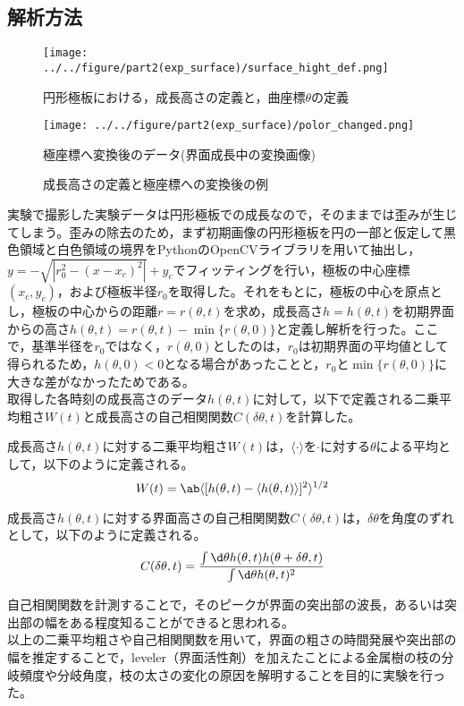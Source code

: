 \documentclass[autodetect-engine,dvi=dvipdfmx,a4paper,ja=standard,oneside,openany,11pt,draft]{bxjsbook}
\begin{document}
\subsection{解析方法}
\begin{figure}[H]
  \begin{minipage}
    {0.64\textwidth}
    \centering
    \texttt{[image: ../../figure/part2(exp\_surface)/surface\_hight\_def.png]}
    \caption{円形極板における，成長高さの定義と，曲座標$\theta$の定義}
    \label{fig:surface_hight_def}
  \end{minipage}
  \begin{minipage}
    {0.32\textwidth}
    \centering
    \texttt{[image: ../../figure/part2(exp\_surface)/polor\_changed.png]}
    \caption{極座標へ変換後のデータ(界面成長中の変換画像)}
    \label{fig:polor_changed}
  \end{minipage}
  \caption{成長高さの定義と極座標への変換後の例}
  \label{fig:surface_hight_def_polor_changed}
\end{figure}
実験で撮影した実験データは円形極板での成長なので，そのままでは歪みが生じてしまう。歪みの除去のため，まず初期画像の円形極板を円の一部と仮定して黒色領域と白色領域の境界をPythonのOpenCVライブラリを用いて抽出し，$y=-\sqrt{|r_0^2-(x-x_c)^2|}+y_c$でフィッティングを行い，極板の中心座標$(x_c,y_c)$，および極板半径$r_0$を取得した。それをもとに，極板の中心を原点とし，極板の中心からの距離$r=r(\theta,t)$を求め，成長高さ$h=h(\theta,t)$を初期界面からの高さ$h(\theta,t)=r(\theta,t)-\min{\{r(\theta,0)\}}$と定義し解析を行った。ここで，基準半径を$r_0$ではなく，$r(\theta,0)$としたのは，$r_0$は初期界面の平均値として得られるため，$h(\theta,0)<0$となる場合があったことと，$r_0$と$\min{\{r(\theta,0)\}}$に大きな差がなかったためである。\\
取得した各時刻の成長高さのデータ$h(\theta,t)$に対して，以下で定義される二乗平均粗さ$W(t)$と成長高さの自己相関関数$C(\delta\theta,t)$を計算した。
\begin{definition}
  成長高さ$h(\theta,t)$に対する二乗平均粗さ$W(t)$は，$\langle\cdot\rangle$を$\cdot$に対する$\theta$による平均として，以下のように定義される。
  \begin{equation}
    W(t) = \ab\langle[h(\theta,t)-\langle h(\theta,t)\rangle]^2\rangle^{1/2}
  \end{equation}
  \label{def:W}
\end{definition}
\begin{definition}
  成長高さ$h(\theta,t)$に対する界面高さの自己相関関数$C(\delta\theta,t)$は，$\delta \theta$を角度のずれとして，以下のように定義される。
  \begin{equation}
    C(\delta\theta,t) = \frac{\int \d \theta h(\theta,t)h(\theta+\delta\theta,t)}{\int \d \theta h(\theta,t)^2}
  \end{equation}
  \label{def:C}
\end{definition}
自己相関関数を計測することで，そのピークが界面の突出部の波長，あるいは突出部の幅をある程度知ることができると思われる。\\
以上の二乗平均粗さや自己相関関数を用いて，界面の粗さの時間発展や突出部の幅を推定することで，leveler（界面活性剤）を加えたことによる金属樹の枝の分岐頻度や分岐角度，枝の太さの変化の原因を解明することを目的に実験を行った。
\ifdraft{
  
  
}{}
\end{document}
